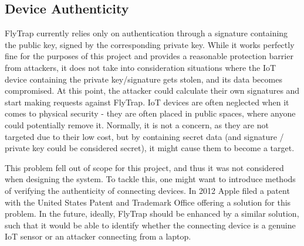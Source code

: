 \subsection{Device Authenticity}
FlyTrap currently relies only on authentication through a signature containing the public key, signed by the corresponding private key. While it works perfectly fine for the purposes of this project and provides a reasonable protection barrier from attackers, it does not take into consideration situations where the IoT device containing the private key/signature gets stolen, and its data becomes compromised. At this point, the attacker could calculate their own signatures and start making requests against FlyTrap. IoT devices are often neglected when it comes to physical security - they are often placed in public spaces, where anyone could potentially remove it. Normally, it is not a concern, as they are not targeted due to their low cost, but by containing secret data (and signature / private key could be considered secret), it might cause them to become a target.

This problem fell out of scope for this project, and thus it was not considered when designing the system. To tackle this, one might want to introduce methods of verifying the authenticity of connecting devices. In 2012 Apple filed a patent with the United States Patent and Trademark Office \cite{omernick2012systems} offering a solution for this problem. In the future, ideally, FlyTrap should be enhanced by a similar solution, such that it would be able to identify whether the connecting device is a genuine IoT sensor or an attacker connecting from a laptop.